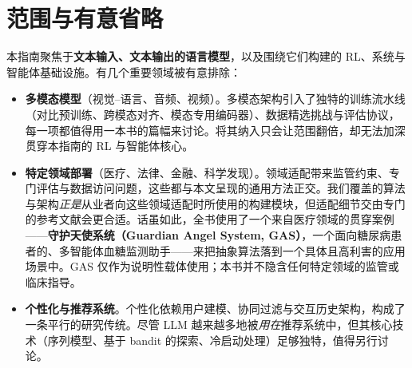 \documentclass[11pt,a4paper,openany]{book}
\begin{document}
\section*{范围与有意省略}
\label{scope-and-deliberate-omissions}

本指南聚焦于\textbf{文本输入、文本输出的语言模型}，以及围绕它们构建的 RL、系统与智能体基础设施。有几个重要领域被有意排除：

\begin{itemize}
  \item \textbf{多模态模型}（视觉--语言、音频、视频）。多模态架构引入了独特的训练流水线（对比预训练、跨模态对齐、模态专用编码器）、数据精选挑战与评估协议，每一项都值得用一本书的篇幅来讨论。将其纳入只会让范围翻倍，却无法加深贯穿本指南的 RL 与智能体核心。
  \item \textbf{特定领域部署}（医疗、法律、金融、科学发现）。领域适配带来监管约束、专门评估与数据访问问题，这些都与本文呈现的通用方法正交。我们覆盖的算法与架构\emph{正是}从业者向这些领域适配时所使用的构建模块，但适配细节交由专门的参考文献会更合适。话虽如此，全书使用了一个来自医疗领域的贯穿案例——\textbf{守护天使系统（Guardian Angel System, GAS）}，一个面向糖尿病患者的、多智能体血糖监测助手——来把抽象算法落到一个具体且高利害的应用场景中。GAS 仅作为说明性载体使用；本书并不隐含任何特定领域的监管或临床指导。
  \item \textbf{个性化与推荐系统}。个性化依赖用户建模、协同过滤与交互历史架构，构成了一条平行的研究传统。尽管 LLM 越来越多地被\emph{用在}推荐系统中，但其核心技术（序列模型、基于 bandit 的探索、冷启动处理）足够独特，值得另行讨论。
\end{itemize}
\end{document}
